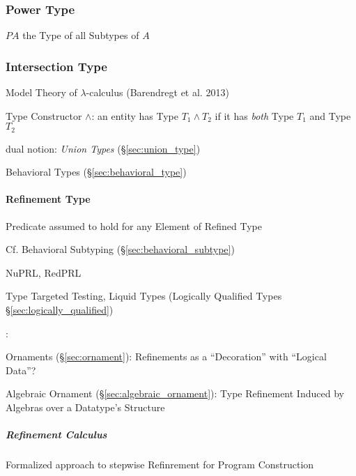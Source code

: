 \subsubsection{Power Type}\label{sec:power_type}

$P A$ the Type of all Subtypes of $A$



\subsubsection{Intersection Type}\label{sec:intersection_type}

Model Theory of $\lambda$-calculus (Barendregt et al. 2013)

Type Constructor $\wedge$: an entity has Type $T_1 \wedge T_2$ if it
has \emph{both} Type $T_1$ and Type $T_2$


dual notion: \emph{Union Types} (\S\ref{sec:union_type})

\fist Behavioral Types (\S\ref{sec:behavioral_type})



\paragraph{Refinement Type}\label{sec:refinement_type}\hfill


Predicate assumed to hold for any Element of Refined Type

\fist Cf. Behavioral Subtyping (\S\ref{sec:behavioral_subtype})

NuPRL, RedPRL

Type Targeted Testing, Liquid Types (Logically Qualified Types
\S\ref{sec:logically_qualified})


\asterism


\cite{mcbride13}:

Ornaments (\S\ref{sec:ornament}): Refinements as a ``Decoration'' with
``Logical Data''? %

Algebraic Ornament (\S\ref{sec:algebraic_ornament}): Type Refinement
Induced by Algebras over a Datatype's Structure



\subparagraph{Refinement Calculus}\label{sec:refinement_calculus}\hfill

Formalized approach to stepwise Refinrement for Program Construction

